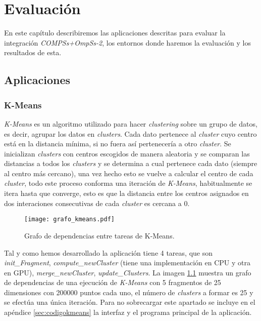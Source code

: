 \chapter{Evaluación}
\label{sec:estudiorend}

En este capítulo describiremos las aplicaciones descritas para evaluar la integración \textit{COMPSs+OmpSs-2}, los entornos donde haremos la evaluación y los resultados de esta.  

\section{Aplicaciones}
\subsection{K-Means}

\textit{K-Means} es un algoritmo utilizado para hacer \textit{clustering} sobre un grupo de datos, es decir, agrupar los datos en \textit{clusters}. Cada dato pertenece al \textit{cluster} cuyo centro está en la distancia mínima, si no fuera así pertenecería a otro \textit{cluster}. Se inicializan \textit{clusters} con centros escogidos de manera aleatoria y se comparan las distancias a todos los \textit{clusters} y se determina a cual pertenece cada dato (siempre al centro más cercano), una vez hecho esto se vuelve a calcular el centro de cada \textit{cluster}, todo este proceso conforma una iteración de \textit{K-Means}, habitualmente se itera hasta que converge, esto es que la distancia entre los centros asignados en dos interaciones consecutivas de cada \textit{cluster} es cercana a 0.

\begin{figure}[h]
	\centering 
	\caption{Grafo de dependencias entre tareas de K-Means.}
	\texttt{[image: grafo\_kmeans.pdf]}
	\label{fig:grafokmeans}
\end{figure}

Tal y como hemos desarrollado la aplicación tiene 4 tareas, que son \textit{init\_Fragment}, \textit{compute\_newCluster} (tiene una implementación en CPU y otra en GPU), \textit{merge\_newCluster}, \textit{update\_Clusters}. La imagen \ref{fig:grafokmeans} muestra un grafo de dependencias de una ejecución de \textit{K-Means} con 5 fragmentos de 25 dimensiones con 200000 puntos cada uno, el número de \textit{clusters} a formar es 25 y se efectúa una única iteración. Para no sobrecargar este apartado se incluye en el apéndice \ref{sec:codigokmeans} la interfaz y el programa principal de la aplicación.

